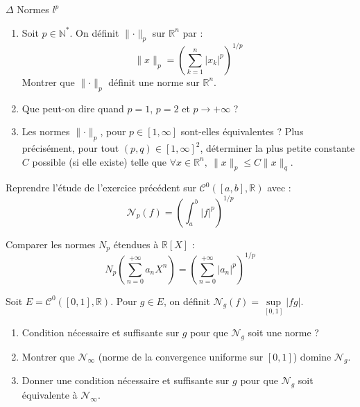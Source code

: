 \documentclass[french,a4paper]{article}
\newcommand{\N}{\mathbb{N}}
\newcommand{\R}{\mathbb{R}}
\newcommand{\st}{^*}
\theoremstyle{plain}
\theoremstyle{definition}
\theoremstyle{remark}
\begin{document}
\begin{ex}{$\Delta$ Normes $l^p$}
	\begin{enumerate}
		\item Soit $p\in\N\st$. On définit $\lVert\cdot\rVert_p$ sur $\R^n$ par : $$\lVert x\rVert_p=\left(\sum_{k=1}^{n}\lvert x_k\rvert^p\right)^{1/p}$$ Montrer que $\lVert\cdot\rVert_p$ définit une norme sur $\R^n$.
		\item Que peut-on dire quand $p=1$, $p=2$ et $p\longrightarrow+\infty$ ?
		\item Les normes $\lVert\cdot\rVert_p$, pour $p\in[1,\infty]$ sont-elles équivalentes ? Plus précisément, pour tout $(p,q)\in[1,\infty]^2$, déterminer la plus petite constante $C$ possible (si elle existe) telle que $\forall x\in\R^n,\ \lVert x\rVert_p\leqslant C\lVert x\rVert_q$.
	\end{enumerate}
\end{ex}

\begin{ex}{}
	Reprendre l'étude de l'exercice précédent sur $\mathcal{C}^0([a,b],\R)$ avec : $$\mathcal{N}_p(f)=\left(\int_{a}^{b}\lvert f\rvert^p\right)^{1/p}$$
\end{ex}

\begin{ex}{}
	Comparer les normes $N_p$ étendues à $\R[X]$ : $$N_p\left(\sum_{n=0}^{+\infty}a_nX^n\right)=\left(\sum_{n=0}^{+\infty}\lvert a_n\rvert^p\right)^{1/p}$$
\end{ex}

\begin{ex}{}
	Soit $E=\mathcal{C}^0([0,1],\R)$. Pour $g\in E$, on définit $\mathcal{N}_g(f)=\displaystyle\underset{[0,1]}{\sup}\lvert fg\rvert$.
	\begin{enumerate}
		\item Condition nécessaire et suffisante sur $g$ pour que $\mathcal{N}_g$ soit une norme ?
		\item Montrer que $\mathcal{N}_\infty$ (norme de la convergence uniforme sur $[0,1]$) domine $\mathcal{N}_g$.
		\item Donner une condition nécessaire et suffisante sur $g$ pour que $\mathcal{N}_g$ soit équivalente à $\mathcal{N}_\infty$.
	\end{enumerate}
\end{ex}
\end{document}
